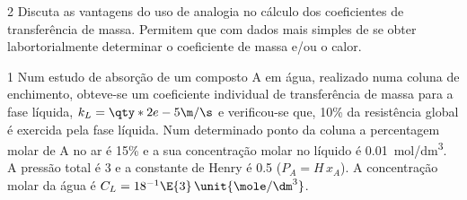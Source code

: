 \documentclass[\mainfilename]{subfiles}
\begin{document}
\begin{questionBox}2{ %
    Discuta as vantagens do uso de analogia no cálculo dos coeficientes de transferência de massa.
} %
    \answer{}
    Permitem que com dados mais simples de se obter labortorialmente determinar o coeficiente de massa e/ou o calor.
\end{questionBox}

\begin{questionBox}1{ %
    Num estudo de absorção de um composto A em água, realizado numa coluna de enchimento, obteve-se um coeficiente individual de transferência de massa para a fase líquida, \(k_L=\qty*{2e-5}{\m/\s}\) e verificou-se que, 10\% da resistência global é exercida pela fase líquida. Num determinado ponto da coluna a percentagem molar de A no ar é 15\% e a sua concentração molar no líquido é \qty*{0.01}{\mole/\dm^3}. A pressão total é \qty*{3}{\atm} e a constante de Henry é \qty*{0.5}{\atm} (\(P_A= H \,x_A\)). A concentração molar da água é \(C_L=18^{-1}\E{3}\,\unit{\mole/\dm^3}\).
} %
    
\end{questionBox}
\end{document}
